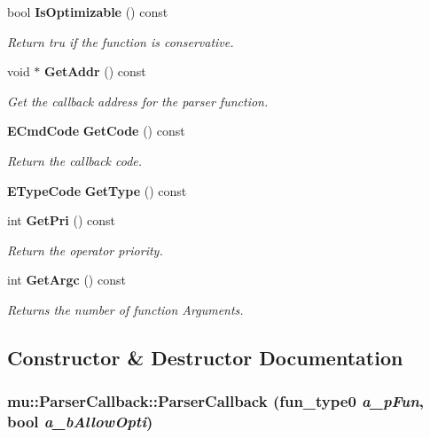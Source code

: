\begin{CompactItemize}
bool {\bf IsOptimizable} () const 
\begin{CompactList}\small\item\em Return tru if the function is conservative. \item\end{CompactList}\item 
void $\ast$ {\bf GetAddr} () const 
\begin{CompactList}\small\item\em Get the callback address for the parser function. \item\end{CompactList}\item 
{\bf ECmdCode} {\bf GetCode} () const 
\begin{CompactList}\small\item\em Return the callback code. \item\end{CompactList}\item 
{\bf ETypeCode} {\bf GetType} () const 
\item 
int {\bf GetPri} () const 
\begin{CompactList}\small\item\em Return the operator priority. \item\end{CompactList}\item 
int {\bf GetArgc} () const 
\begin{CompactList}\small\item\em Returns the number of function Arguments. \item\end{CompactList}\end{CompactItemize}


\subsection{Constructor \& Destructor Documentation}
\subsubsection[ParserCallback]{\setlength{\rightskip}{0pt plus 5cm}mu::ParserCallback::ParserCallback ({\bf fun\_\-type0} {\em a\_\-pFun}, \/  bool {\em a\_\-bAllowOpti})}\label{classmu_1_1ParserCallback_3f203039da4fe6deaabd7ea289a82386}


